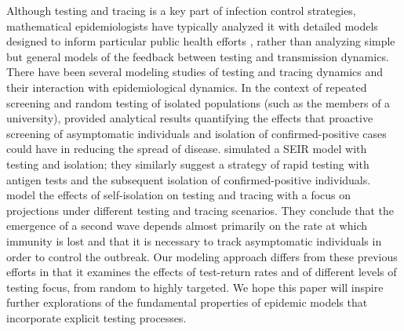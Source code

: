 \documentclass[smallextended]{svjour3}       %
\newcommand{\comment}{\showcomment}
\newcommand{\showcomment}[3]{\textcolor{#1}{\textbf{[#2: }\textsl{#3}\textbf{]}}}
\newcommand{\rev}[1]{\comment{red}{Revised}{#1}}
\DeclareRobustCommand\_{\ifmmode\expandafter\subtxt\else\textunderscore\fi}
\begin{document}
Although testing and tracing is a key part of infection control strategies, mathematical epidemiologists have typically analyzed it with detailed models designed to inform particular public health efforts \citep{endo2020implication,hellewell2020feasibility,jenness2020modeling}, rather than analyzing simple but general models of the feedback between testing and transmission dynamics.
There have been several modeling studies of testing and tracing dynamics and their interaction with epidemiological dynamics. In the context of repeated screening and random testing of isolated populations (such as the members of a university), \cite{bergstrom2020frequency} provided analytical results quantifying the effects that proactive screening of asymptomatic individuals and isolation of confirmed-positive cases could have in reducing the spread of disease. 
\cite{rogers2021high} simulated a SEIR model with testing and isolation; they similarly suggest a strategy of rapid testing with antigen tests and the subsequent isolation of confirmed-positive individuals.
\cite{friston2021testing} model the effects of self-isolation on testing and tracing with a focus on projections under different testing and tracing scenarios. They conclude that the emergence of a second wave depends almost primarily on the rate at which immunity is lost and that it is necessary to track asymptomatic individuals in order to control the outbreak. 
Our modeling approach differs from these previous efforts in that it examines the effects of test-return rates and of different levels of testing focus, from random to highly targeted. We hope this paper will inspire further explorations of the fundamental properties of epidemic models that incorporate explicit testing processes.
\end{document}
